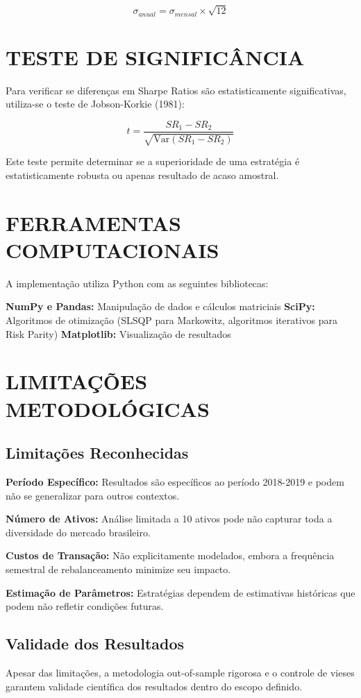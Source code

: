 \begin{equation}
\sigma_{anual} = \sigma_{mensal} \times \sqrt{12}
\end{equation}

\section{TESTE DE SIGNIFICÂNCIA}

Para verificar se diferenças em Sharpe Ratios são estatisticamente significativas, utiliza-se o teste de Jobson-Korkie (1981):

\begin{equation}
t = \frac{SR_1 - SR_2}{\sqrt{\text{Var}(SR_1 - SR_2)}}
\end{equation}

Este teste permite determinar se a superioridade de uma estratégia é estatisticamente robusta ou apenas resultado de acaso amostral.

\section{FERRAMENTAS COMPUTACIONAIS}

A implementação utiliza Python com as seguintes bibliotecas:

\textbf{NumPy e Pandas:} Manipulação de dados e cálculos matriciais
\textbf{SciPy:} Algoritmos de otimização (SLSQP para Markowitz, algoritmos iterativos para Risk Parity)
\textbf{Matplotlib:} Visualização de resultados

\section{LIMITAÇÕES METODOLÓGICAS}

\subsection{Limitações Reconhecidas}

\textbf{Período Específico:} Resultados são específicos ao período 2018-2019 e podem não se generalizar para outros contextos.

\textbf{Número de Ativos:} Análise limitada a 10 ativos pode não capturar toda a diversidade do mercado brasileiro.

\textbf{Custos de Transação:} Não explicitamente modelados, embora a frequência semestral de rebalanceamento minimize seu impacto.

\textbf{Estimação de Parâmetros:} Estratégias dependem de estimativas históricas que podem não refletir condições futuras.

\subsection{Validade dos Resultados}

Apesar das limitações, a metodologia out-of-sample rigorosa e o controle de vieses garantem validade científica dos resultados dentro do escopo definido.